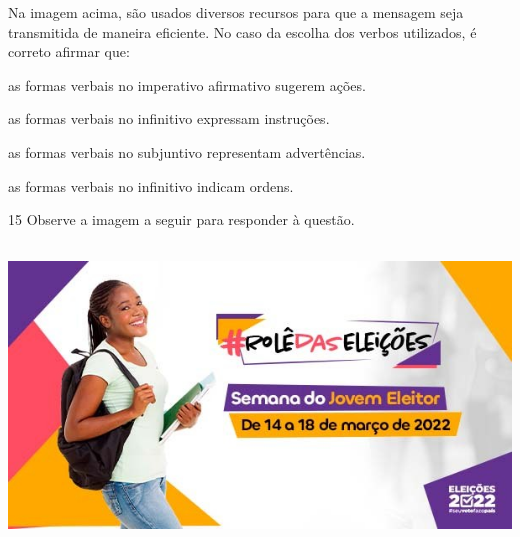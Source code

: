 
Na imagem acima, são usados diversos recursos para que a mensagem
seja transmitida de maneira eficiente. No caso da escolha dos
verbos utilizados, é correto afirmar que:

\begin{escolha}

    \item as formas verbais no imperativo afirmativo sugerem ações.

    \item as formas verbais no infinitivo expressam instruções.

    \item as formas verbais no subjuntivo representam advertências.

    \item as formas verbais no infinitivo indicam ordens.

\end{escolha}

\num{15} Observe a imagem a seguir para responder à questão.

\includegraphics[width=5.90551in,height=3.15278in]{./imgSAEB_7_POR/media/image20.png}


